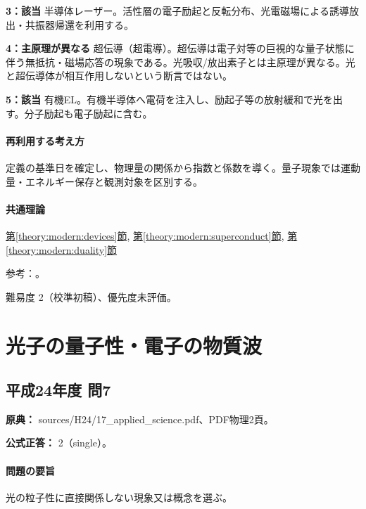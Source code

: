\noindent\textbf{3：該当} 半導体レーザー。活性層の電子励起と反転分布、光電磁場による誘導放出・共振器帰還を利用する。\par

\noindent\textbf{4：主原理が異なる} 超伝導（超電導）。超伝導は電子対等の巨視的な量子状態に伴う無抵抗・磁場応答の現象である。光吸収/放出素子とは主原理が異なる。光と超伝導体が相互作用しないという断言ではない。\par

\noindent\textbf{5：該当} 有機EL。有機半導体へ電荷を注入し、励起子等の放射緩和で光を出す。分子励起も電子励起に含む。\par

\paragraph{再利用する考え方} 定義の基準日を確定し、物理量の関係から指数と係数を導く。量子現象では運動量・エネルギー保存と観測対象を区別する。

\paragraph{共通理論} \hyperref[theory:modern:devices]{第\ref*{theory:modern:devices}節}, \hyperref[theory:modern:superconduct]{第\ref*{theory:modern:superconduct}節}, \hyperref[theory:modern:duality]{第\ref*{theory:modern:duality}節}

\par 参考：\cite{modern_pv,modern_led,modern_laser,modern_oled,modern_superconduct,modern_pairs}。

\par 難易度 2（校準初稿）、優先度未評価。

\section{光子の量子性・電子の物質波}

\subsection{平成24年度 問7}
\label{q:h24-reg-applied-07}

\noindent\textbf{原典：} sources/H24/17\_applied\_science.pdf、PDF物理2頁。

\textbf{公式正答：} 2（single）。

\paragraph{問題の要旨} 光の粒子性に直接関係しない現象又は概念を選ぶ。

